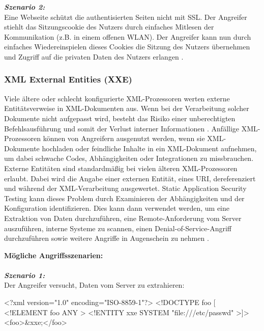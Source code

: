 \textbf{\textit{Szenario 2:}}\\

Eine Webseite schützt die authentisierten Seiten nicht mit SSL. Der Angreifer stiehlt das Sitzungscookie des Nutzers durch einfaches Mitlesen der Kommunikation (z.B. in einem offenen WLAN). Der Angreifer kann nun durch einfaches Wiedereinspielen dieses Cookies die Sitzung des Nutzers übernehmen und Zugriff auf die privaten Daten des Nutzers erlangen \cite[9]{owasp17top10}.

\subsubsection{XML External Entities (XXE)}

Viele ältere oder schlecht konfigurierte XML-Prozessoren werten externe Entitätsverweise in XML-Dokumenten aus. Wenn bei der Verarbeitung solcher Dokumente nicht aufgepasst wird, besteht das Risiko einer unberechtigten Befehlsausführung und somit der Verlust interner Informationen \cite[6]{owasp17top10}. Anfällige XML-Prozessoren können von Angreifern ausgenutzt werden, wenn sie XML-Dokumente hochladen oder feindliche Inhalte in ein XML-Dokument aufnehmen, um dabei schwache Codes, Abhängigkeiten oder Integrationen zu missbrauchen. Externe Entitäten sind standardmäßig bei vielen älteren XML-Prozessoren erlaubt. Dabei wird die Angabe einer externen Entität, eines URI, dereferenziert und während der XML-Verarbeitung ausgewertet. Static Application Security Testing kann dieses Problem durch Examinieren der Abhängigkeiten und der Konfiguration identifizieren. Dies kann dann verwendet werden, um eine Extraktion von Daten durchzuführen, eine Remote-Anforderung vom Server auszuführen, interne Systeme zu scannen, einen Denial-of-Service-Angriff durchzuführen sowie weitere Angriffe in Augenschein zu nehmen \cite[10]{owasp17top10}.

\textbf{Mögliche Angriffsszenarien:}\\
\\
\textbf{\textit{Szenario 1:}}\\
Der Angreifer versucht, Daten vom Server zu extrahieren\cite[10]{owasp17top10}:\\

\begin{LaTeXCode}[caption={XML-Beispiel},captionpos=b, label=LaTeXCode:xxe1][numbers=none]
<?xml version="1.0" encoding="ISO-8859-1"?>
<!DOCTYPE foo [
<!ELEMENT foo ANY >
<!ENTITY xxe SYSTEM "file:///etc/passwd" >]>
<foo>\&xxe;</foo>
\end{LaTeXCode}

